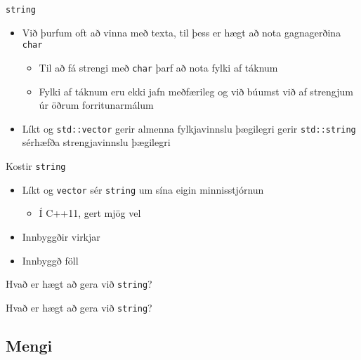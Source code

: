 \begin{frame}{\texttt{string}}
    \begin{itemize}
        \item Við þurfum oft að vinna með texta, til þess er hægt að nota gagnagerðina \texttt{char}
        \begin{itemize}
            \item Til að fá strengi með \texttt{char} þarf að nota fylki af táknum
            \item Fylki af táknum eru ekki jafn meðfærileg og við búumst við af strengjum úr öðrum forritunarmálum 
        \end{itemize}
        \item Líkt og \texttt{std::vector} gerir almenna fylkjavinnslu þægilegri gerir \texttt{std::string} sérhæfða strengjavinnslu þægilegri
    \end{itemize}
\end{frame}

\begin{frame}{Kostir \texttt{string}}
\begin{itemize}
    \item Líkt og \texttt{vector} sér \texttt{string} um sína eigin minnisstjórnun
    \begin{itemize}
    \item Í C++11, gert mjög vel
    \end{itemize}
    \item Innbyggðir virkjar
    \item Innbyggð föll
\end{itemize}
\end{frame}

\begin{frame}{Hvað er hægt að gera við \texttt{string}?}
\end{frame}

\begin{frame}{Hvað er hægt að gera við \texttt{string}?}
\end{frame}


\subsection{Mengi}

